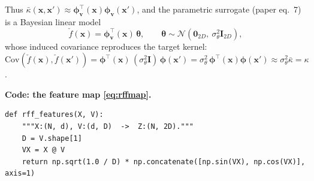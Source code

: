 \documentclass[11pt]{article}
\theoremstyle{plain}
\theoremstyle{definition}
\newcommand{\N}{\mathcal{N}}
\newcommand{\I}{\mathbf{I}}
\newcommand{\x}{\mathbf{x}}
\newcommand{\bphi}{\boldsymbol{\phi}}
\newcommand{\btheta}{\boldsymbol{\theta}}
\begin{document}
Thus $\bar\kappa(\x,\x')\approx\bphi_{\mathbf v}^\top(\x)\bphi_{\mathbf v}(\x')$, and the parametric surrogate (paper eq.~7) is a Bayesian linear model
\begin{equation}
\check f(\x)=\bphi_{\mathbf v}^\top(\x)\,\btheta,\qquad \btheta\sim\N(\mathbf 0_{2D},\ \sigma_\theta^2\I_{2D}),
\label{eq:param}
\end{equation}
whose induced covariance reproduces the target kernel: $\mathrm{Cov}(\check f(\x),\check f(\x'))=\bphi^\top(\x)\,(\sigma_\theta^2\I)\,\bphi(\x')=\sigma_\theta^2\,\bphi^\top(\x)\bphi(\x')\approx\sigma_\theta^2\bar\kappa=\kappa$.

\noindent\textbf{Code: the feature map \eqref{eq:rffmap}.}
\begin{lstlisting}
def rff_features(X, V):
    """X:(N, d), V:(d, D)  ->  Z:(N, 2D)."""
    D = V.shape[1]
    VX = X @ V
    return np.sqrt(1.0 / D) * np.concatenate([np.sin(VX), np.cos(VX)], axis=1)
\end{lstlisting}
\end{document}
